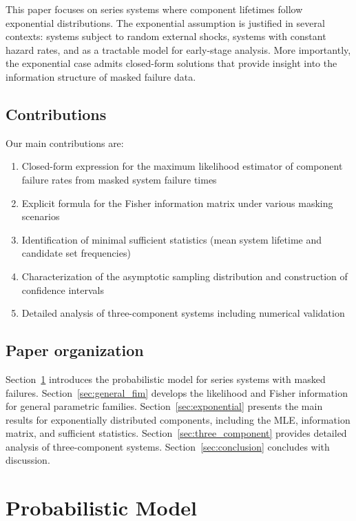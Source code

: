 \documentclass[12pt]{article}
\theoremstyle{definition}
\begin{document}
This paper focuses on series systems where component lifetimes follow exponential distributions. The exponential assumption is justified in several contexts: systems subject to random external shocks, systems with constant hazard rates, and as a tractable model for early-stage analysis. More importantly, the exponential case admits closed-form solutions that provide insight into the information structure of masked failure data.

\subsection{Contributions}

Our main contributions are:
\begin{enumerate}
    \item Closed-form expression for the maximum likelihood estimator of component failure rates from masked system failure times
    \item Explicit formula for the Fisher information matrix under various masking scenarios
    \item Identification of minimal sufficient statistics (mean system lifetime and candidate set frequencies)
    \item Characterization of the asymptotic sampling distribution and construction of confidence intervals
    \item Detailed analysis of three-component systems including numerical validation
\end{enumerate}

\subsection{Paper organization}

Section~\ref{sec:model} introduces the probabilistic model for series systems with masked failures. Section~\ref{sec:general_fim} develops the likelihood and Fisher information for general parametric families. Section~\ref{sec:exponential} presents the main results for exponentially distributed components, including the MLE, information matrix, and sufficient statistics. Section~\ref{sec:three_component} provides detailed analysis of three-component systems. Section~\ref{sec:conclusion} concludes with discussion.

\section{Probabilistic Model}
\label{sec:model}
\end{document}
